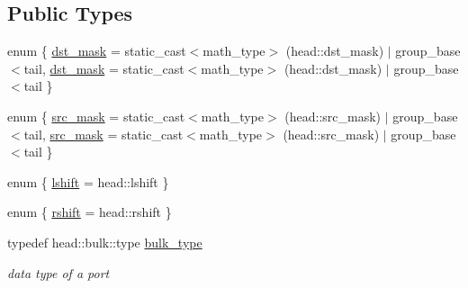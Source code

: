 \subsection*{Public Types}
\begin{DoxyCompactItemize}
\item 
enum \{ \hyperlink{structavrpp_1_1bus_1_1group__base_3_01_1_1avrpp_1_1typelist_1_1typelist_3_01head_00_01tail_01_4_00_01bus__data__type_01_4_a4306dd32947a9db3e4cc48bef873863ba5e6ccd72261a388eb6571af815ea1368}{dst\_\-mask} =  static\_\-cast$<$math\_\-type$>$ (head::dst\_\-mask) $|$ group\_\-base $<$tail, 
\hyperlink{structavrpp_1_1bus_1_1group__base_3_01_1_1avrpp_1_1typelist_1_1typelist_3_01head_00_01tail_01_4_00_01bus__data__type_01_4_a4306dd32947a9db3e4cc48bef873863ba5e6ccd72261a388eb6571af815ea1368}{dst\_\-mask} =  static\_\-cast$<$math\_\-type$>$ (head::dst\_\-mask) $|$ group\_\-base $<$tail
 \}
\item 
enum \{ \hyperlink{structavrpp_1_1bus_1_1group__base_3_01_1_1avrpp_1_1typelist_1_1typelist_3_01head_00_01tail_01_4_00_01bus__data__type_01_4_aa6e47c038ca297e0208a850fae93fc00a49f7d00bac98b8e95f8bb82a800948cc}{src\_\-mask} =  static\_\-cast$<$math\_\-type$>$ (head::src\_\-mask) $|$ group\_\-base $<$tail, 
\hyperlink{structavrpp_1_1bus_1_1group__base_3_01_1_1avrpp_1_1typelist_1_1typelist_3_01head_00_01tail_01_4_00_01bus__data__type_01_4_aa6e47c038ca297e0208a850fae93fc00a49f7d00bac98b8e95f8bb82a800948cc}{src\_\-mask} =  static\_\-cast$<$math\_\-type$>$ (head::src\_\-mask) $|$ group\_\-base $<$tail
 \}
\item 
enum \{ \hyperlink{structavrpp_1_1bus_1_1group__base_3_01_1_1avrpp_1_1typelist_1_1typelist_3_01head_00_01tail_01_4_00_01bus__data__type_01_4_a470511d7d76fbee6709a16b76d3d62d6a1afb8fe1e05fd797a22ba194ebba1253}{lshift} =  head::lshift
 \}
\item 
enum \{ \hyperlink{structavrpp_1_1bus_1_1group__base_3_01_1_1avrpp_1_1typelist_1_1typelist_3_01head_00_01tail_01_4_00_01bus__data__type_01_4_a6ab6e1ac0d205be9c7e3cf8a100c739faf83634e6b05b5fc0ef6a79987316ca0b}{rshift} =  head::rshift
 \}
\item 
typedef head::bulk::type \hyperlink{structavrpp_1_1bus_1_1group__base_3_01_1_1avrpp_1_1typelist_1_1typelist_3_01head_00_01tail_01_4_00_01bus__data__type_01_4_aabf304c3e2b2801e376ef2bf62a2062a}{bulk\_\-type}
\begin{DoxyCompactList}\small\item\em data type of a port \item\end{DoxyCompactList}\item 

\end{DoxyCompactItemize}
